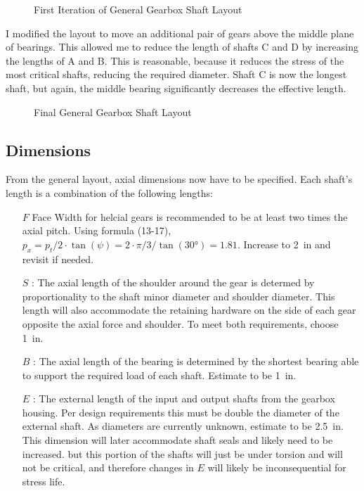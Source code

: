 \documentclass[titlepage]{article} %
\begin{document}
\begin{figure}[t]
    \centering
    
    \caption{First Iteration of General Gearbox Shaft Layout}
    \label{fig:layout1}
\end{figure}

I modified the layout to move an additional pair of gears above the middle plane of
bearings. This allowed me to reduce the length of shafts C and D by increasing
the lengths of A and B. This is reasonable, because it reduces the stress of the
most critical shafts, reducing the required diameter. Shaft C is now the longest
shaft, but again, the middle bearing significantly decreases the effective
length. 

\begin{figure}[t]
    \centering
    
    \caption{Final General Gearbox Shaft Layout}
    \label{fig:layout2}
\end{figure}


\subsection{Dimensions}

From the general layout, axial dimensions now have to be specified. Each shaft's
length is a combination of the following lengths:

\begin{itemize}[label=]
    \item[$F$] Face Width for helcial gears is recommended to be at least two
    times the axial pitch. Using formula (13-17)\cite{shigleydesign}, $p_x = p_t
    /2 \cdot \tan(\psi) = 2 \cdot \pi/3/\tan(\ang{30}) = 1.81$. Increase to \SI{2}{in} and
    revisit if needed.
    \item[$S$]: The axial length of the shoulder around the gear is determed by
    proportionality to the shaft minor diameter and shoulder diameter. This
    length will also accommodate the retaining hardware on the side of each gear
    opposite the axial force and shoulder. To meet both requirements, choose
    \SI{1}{in}.
    \item[$B$]: The axial length of the bearing is determined by the shortest
    bearing able to support the required load of each shaft. Estimate to be
    \SI{1}{in}.
    \item[$E$]: The external length of the input and output shafts from the
    gearbox housing. Per design requirements this must be double the diameter of
    the external shaft. As diameters are currently unknown, estimate to be
    \SI{2.5}{in}. This dimension will later accommodate shaft seals and likely
    need to be increased. but this portion of the shafts will just be under
    torsion and will not be critical, and therefore changes in $E$ will likely
    be inconsequential for stress life.
\end{itemize}
\end{document}
